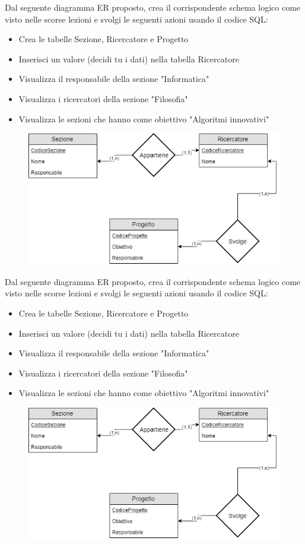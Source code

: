 \documentclass[addpoints]{exam}
\begin{document}
	
	Dal seguente diagramma ER proposto, crea il corrispondente schema logico come visto nelle scorse lezioni e svolgi le seguenti azioni usando il codice SQL:
	\begin{itemize}
		\item Crea le tabelle Sezione, Ricercatore e Progetto
		\item Inserisci un valore (decidi tu i dati) nella tabella Ricercatore
		\item Visualizza il responsabile della sezione "Informatica"
		\item Visualizza i ricercatori della sezione "Filosofia"
		\item Visualizza le sezioni che hanno come obiettivo "Algoritmi innovativi"
	\end{itemize}

	\begin{figure}[h!]
		\centering
		\includegraphics[scale=0.5]{images/Ricercatori.png}
	\end{figure}

	\vspace{40mm}
	
	Dal seguente diagramma ER proposto, crea il corrispondente schema logico come visto nelle scorse lezioni e svolgi le seguenti azioni usando il codice SQL:
	\begin{itemize}
		\item Crea le tabelle Sezione, Ricercatore e Progetto
		\item Inserisci un valore (decidi tu i dati) nella tabella Ricercatore
		\item Visualizza il responsabile della sezione "Informatica"
		\item Visualizza i ricercatori della sezione "Filosofia"
		\item Visualizza le sezioni che hanno come obiettivo "Algoritmi innovativi"
	\end{itemize}
	
	\begin{figure}[h!]
		\centering
		\includegraphics[scale=0.5]{images/Ricercatori.png}
	\end{figure}
\end{document}

